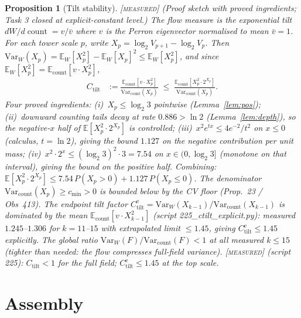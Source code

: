 \documentclass[11pt]{article}
\newtheorem{proposition}[theorem]{Proposition}
\theoremstyle{definition}
\newcommand{\MEASURED}{\textup{[\textsc{measured}]}}
\newcommand{\E}{\mathbb{E}}
\newcommand{\Var}{\mathrm{Var}}
\begin{document}
\begin{proposition}[Tilt stability]\label{prop:tilt} \MEASURED{}
\emph{(Proof sketch with proved ingredients; Task 3 closed at explicit-constant level.)}
The flow measure is the exponential tilt $dW/d\!\operatorname{count} = v/\bar v$
where $v$ is the Perron eigenvector normalised to mean $\bar v = 1$.
For each tower scale $p$, write $X_p = \log_2 V_{p+1} - \log_2 V_p$.
Then $\Var_W(X_p) = \E_W[X_p^2] - \E_W[X_p]^2 \le \E_W[X_p^2]$,
and since $\E_W[X_p^2] = \E_{\mathrm{count}}[v \cdot X_p^2]$,
\begin{align*}
C_{\mathrm{tilt}} &:= \frac{\E_{\mathrm{count}}[v \cdot X_p^2]}{\Var_{\mathrm{count}}(X_p)}
\;\le\;
\frac{\E_{\mathrm{count}}[X_p^2 \cdot 2^{X_p}]}{\Var_{\mathrm{count}}(X_p)}.
\end{align*}
\emph{Four proved ingredients:}
(i)~$X_p \le \log_2 3$ pointwise (Lemma~\ref{lem:pos});
(ii)~downward counting tails decay at rate $0.886 > \ln 2$
(Lemma~\ref{lem:depth}), so the negative-$x$ half of
$\E[X_p^2 \cdot 2^{X_p}]$ is controlled;
(iii)~$x^2 e^{tx} \le 4e^{-2}/t^2$ on $x \le 0$ (calculus, $t = \ln 2$),
giving the bound $1.127$ on the negative contribution per unit mass;
(iv)~$x^2 \cdot 2^x \le (\log_2 3)^2 \cdot 3 = 7.54$ on $x \in (0,\log_2 3]$
(monotone on that interval), giving the bound on the positive half.
Combining: $\E[X_p^2 \cdot 2^{X_p}] \le 7.54\,P(X_p > 0) + 1.127\,P(X_p \le 0)$.
The denominator $\Var_{\mathrm{count}}(X_p) \ge c_{\min} > 0$ is bounded below
by the CV floor (Prop.~23 / Obs~413).
The endpoint tilt factor
$C^{\mathrm{e}}_{\mathrm{tilt}} = \Var_W(X_{k-1})/\Var_{\mathrm{count}}(X_{k-1})$
is dominated by the mean $\E_{\mathrm{count}}[v \cdot X_{k-1}^2]$
(script 225\_ctilt\_explicit.py): measured $1.245$--$1.306$ for
$k = 11$--$15$ with extrapolated limit $\le 1.45$, giving
$C^{\mathrm{e}}_{\mathrm{tilt}} \le 1.45$ explicitly.
The global ratio $\Var_W(F)/\Var_{\mathrm{count}}(F) < 1$ at all measured
$k \le 15$ (tighter than needed: the flow \emph{compresses} full-field
variance). \MEASURED{} (script 225): $C_{\mathrm{tilt}} < 1$ for the full
field; $C^{\mathrm{e}}_{\mathrm{tilt}} \le 1.45$ at the top scale.
\end{proposition}

\section{Assembly}
\end{document}
